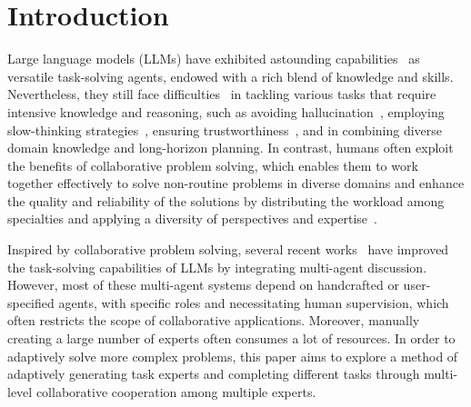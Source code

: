 \section{Introduction}

Large language models (LLMs) have exhibited astounding capabilities~\cite{qin2023chatgpt,openai2023gpt4,shu2023llasm} as versatile task-solving agents, endowed with a rich blend of knowledge and skills. Nevertheless, they still face difficulties~\cite{qin2023chatgpt,openai2023gpt4,gpt4-early-exp} in tackling various tasks that require intensive knowledge and reasoning, such as avoiding hallucination~\cite{maynez-etal-2020-faithfulness}, employing slow-thinking strategies~\cite{sloman1996empirical}, ensuring trustworthiness~\cite{wang2023decodingtrust}, and in combining diverse domain knowledge and long-horizon planning. 
In contrast, humans often exploit the benefits of collaborative problem solving, which enables them to work together effectively to solve non-routine problems in diverse domains and enhance the quality and reliability of the solutions by distributing the workload among specialties and applying a diversity of perspectives and expertise~\cite{nelson2013collaborative,roschelle1995construction,barron2000achieving}.

Inspired by collaborative problem solving, several recent works~\cite{wang2023unleashing,du2023improving,liang2023encouraging,hao2023chatllm} have improved the task-solving capabilities of LLMs by integrating multi-agent discussion. However, most of these multi-agent systems depend on handcrafted or user-specified agents, with specific roles and necessitating human supervision, which often restricts the scope of collaborative applications. Moreover, manually creating a large number of experts often consumes a lot of resources. In order to adaptively solve more complex problems, this paper aims to explore a method of adaptively generating task experts and completing different tasks through multi-level collaborative cooperation among multiple experts.


